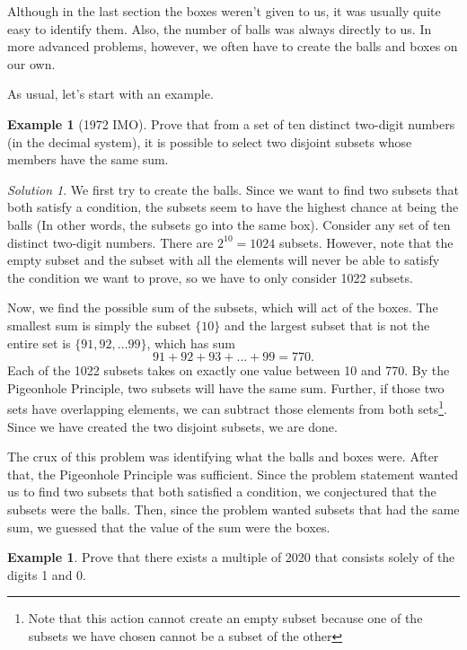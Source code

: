 \documentclass[l1pt]{article}
\theoremstyle{plain}
\theoremstyle{definition}
\newtheorem{example}[thm]{Example}
\theoremstyle{remark}
\newtheorem*{solution}{Solution}
\begin{document}
Although in the last section the boxes weren't given to us, it was usually quite easy to identify them. Also, the number of balls was always directly to us. In more advanced problems, however, we often have to create the balls and boxes on our own. 

As usual, let's start with an example.

\begin{example}[1972 IMO]
Prove that from a set of ten distinct two-digit numbers (in the decimal system), it is possible to select two disjoint subsets whose members have the same sum.
\end{example}

\begin{solution}
We first try to create the balls. Since we want to find two subsets that both satisfy a condition, the subsets seem to have the highest chance at being the balls (In other words, the subsets go into the same box). Consider any set of ten distinct two-digit numbers. There are $2^{10}=1024$ subsets. However, note that the empty subset and the subset with all the elements will never be able to satisfy the condition we want to prove, so we have to only consider 1022 subsets.

Now, we find the possible sum of the subsets, which will act of the boxes. The smallest sum is simply the subset $\{10\}$ and the largest subset that is not the entire set is $\{91, 92, \dots 99\}$, which has sum \[91+92+93+\dots+99=770.\] Each of the 1022 subsets takes on exactly one value between 10 and 770. By the Pigeonhole Principle, two subsets will have the same sum. Further, if those two sets have overlapping elements, we can subtract those elements from both sets\footnote{Note that this action cannot create an empty subset because one of the subsets we have chosen cannot be a subset of the other}. Since we have created the two disjoint subsets, we are done. 
\end{solution}

The crux of this problem was identifying what the balls and boxes were. After that, the Pigeonhole Principle was sufficient. Since the problem statement wanted us to find two subsets that both satisfied a condition, we conjectured that the subsets were the balls. Then, since the problem wanted subsets that had the same sum, we guessed that the value of the sum were the boxes.

\begin{example}
Prove that there exists a multiple of 2020 that consists solely of the digits 1 and 0.
\end{example}
\end{document}
